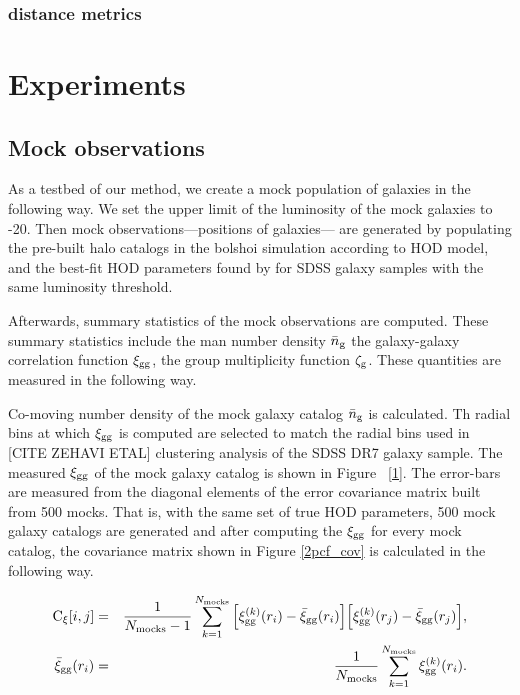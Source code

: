 \documentclass[12pt, preprint]{aastex}
\begin{document}
\subsubsection{distance metrics}


\section{Experiments}\label{sec:data}

\subsection{Mock observations}

\newcommand{\gmf}{\mathcal{\zeta}_{\rm g}}

As a testbed of our method, we create a mock population of galaxies in the following way. We set the upper limit of the luminosity of the mock galaxies to -20. Then mock observations---positions of galaxies--- are generated by populating the pre-built halo catalogs in the bolshoi simulation according to \cite{Zheng:2007aa} HOD model, and the best-fit HOD parameters found by \citet{Zheng:2007aa} for SDSS galaxy samples with the same luminosity threshold.

Afterwards, summary statistics of the mock observations are computed. These summary statistics include the man number density $\bar{n}_{\mathrm{g}}$ the galaxy-galaxy correlation function $\xi_{\mathrm{gg}}$, the group multiplicity function $\gmf$. These quantities are measured in the following way. 

Co-moving number density of the mock galaxy catalog $\bar{n}_{\mathrm{g}}$ is calculated. Th radial bins at which $\xi_{\mathrm{gg}}$ is computed are selected to match the radial bins used in [CITE ZEHAVI ETAL] clustering analysis of the SDSS DR7 galaxy sample. The measured $\xi_{\mathrm{gg}}$ of the mock galaxy catalog is shown in Figure ~\ref{1}. The error-bars are measured from the diagonal elements of the error covariance matrix built from 500 mocks. That is, with the same set of true HOD parameters, 500 mock galaxy catalogs are generated and after computing the $\xi_{\mathrm{gg}}$ for every mock catalog, the covariance matrix shown in Figure \ref{2pcf_cov} is calculated in the following way.

\begin{eqnarray} 
\mathrm{C}_{\xi}[i,j] &=& \frac{1}{N_{\mathrm{mocks}}-1}\sum_{k=1}^{N_{\mathrm{mocks}}} \Big[\xi_{\mathrm{gg}}^{(k)}(r_{i})-\bar{\xi}_{\rm gg}(r_{i})\Big]\Big[\xi_{\mathrm{gg}}^{(k)}(r_{j})-\bar{\xi}_{\rm gg}(r_{j}) \Big], \\
\bar{\xi}_{\rm gg}(r_{i}) &=& \frac{1}{N_{\mathrm{mocks}}}\sum_{k=1}^{N_{\mathrm{mocks}}} \xi_{\mathrm{gg}}^{(k)}(r_{i}).
\end{eqnarray}
\end{document}
